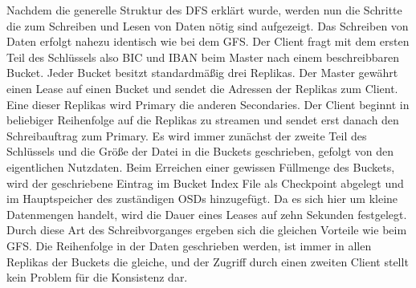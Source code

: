 \documentclass[12pt,oneside,a4paper,parskip]{scrbook}
\begin{document}
Nachdem die generelle Struktur des DFS erklärt wurde, werden nun die Schritte die zum Schreiben und Lesen von Daten nötig sind aufgezeigt.
Das Schreiben von Daten erfolgt nahezu identisch wie bei dem GFS. Der Client fragt mit dem ersten Teil des Schlüssels also BIC und IBAN beim Master nach einem beschreibbaren Bucket. Jeder Bucket besitzt standardmäßig drei Replikas. Der Master gewährt einen Lease auf einen Bucket und sendet die Adressen der Replikas zum Client. Eine dieser Replikas wird Primary die anderen Secondaries. Der Client beginnt in beliebiger Reihenfolge auf die Replikas zu streamen und sendet erst danach den Schreibauftrag zum Primary. Es wird immer zunächst der zweite Teil des Schlüssels und die Größe der Datei in die Buckets geschrieben, gefolgt von den eigentlichen Nutzdaten. Beim Erreichen einer gewissen Füllmenge des Buckets, wird der geschriebene Eintrag im Bucket Index File als Checkpoint abgelegt und im Hauptspeicher des zuständigen OSDs hinzugefügt. Da es sich hier um kleine Datenmengen handelt, wird die Dauer eines Leases auf zehn Sekunden festgelegt. Durch diese Art des Schreibvorganges ergeben sich die gleichen Vorteile wie beim GFS. Die Reihenfolge in der Daten geschrieben werden, ist immer in allen Replikas der Buckets die gleiche, und der Zugriff durch einen zweiten Client stellt kein Problem für die Konsistenz dar.
\end{document}

